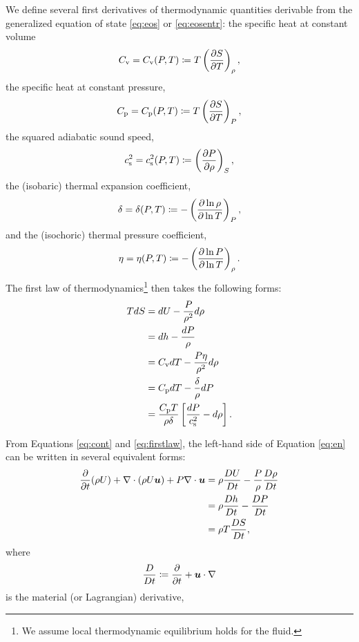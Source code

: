 \documentclass[12pt]{article}
\begin{document}
We define several first derivatives of thermodynamic quantities derivable from the generalized equation of state \eqref{eq:eos} or \eqref{eq:eosentr}: the specific heat at constant volume
\begin{align}\label{eq:cv}
	C_{\rm{v}}=C_{\rm{v}}(P,T)\coloneqq T\left(\frac{\partial S}{\partial T}\right)_\rho,
\end{align}
the specific heat at constant pressure, 
\begin{align}\label{eq:cp}
	C_{\rm{p}}=C_{\rm{p}}(P,T)\coloneqq T\left(\frac{\partial S}{\partial T}\right)_P,
\end{align}
the squared adiabatic sound speed,
\begin{align}\label{eq:cs2}
	c_{\rm s}^2=c_{\rm s}^2(P,T)\coloneqq \left(\frac{\partial P}{\partial\rho}\right)_S,
\end{align}
the (isobaric) thermal expansion coefficient,
\begin{align}\label{eq:delta}
	\delta=\delta(P,T)\coloneqq-\left(\frac{\partial\ln\rho}{\partial\ln T}\right)_P,
\end{align}
and the (isochoric) thermal pressure coefficient, 
\begin{align}\label{eq:eta}
	\eta=\eta(P,T)\coloneqq-\left(\frac{\partial\ln P}{\partial\ln T}\right)_\rho.
\end{align}
The first law of thermodynamics\footnote{We assume local thermodynamic equilibrium holds for the fluid.} then takes the following forms:
\begin{subequations}\label{eq:firstlaw}
	\begin{align}
		TdS &= dU - \frac{P}{\rho^2}d\rho \\
		&= dh - \frac{dP}{\rho}\\
		&= C_{\rm{v}} dT - \frac{P\eta}{\rho^2}d\rho\\		
		&= C_{\rm{p}} dT - \frac{\delta}{\rho}dP\\
		&=\frac{C_{\rm{p}} T}{\rho\delta}\left[\frac{dP}{c_{\rm s}^2}-d\rho\right].
	\end{align}
\end{subequations}

	From Equations \eqref{eq:cont} and \eqref{eq:firstlaw}, the left-hand side of Equation \eqref{eq:en} can be written in several equivalent forms:
	\begin{subequations}\label{eq:enlhs}
		\begin{align}
			\frac{\partial}{\partial t}(\rho U) + \nabla\cdot(\rho U\bm{u}) + P\nabla\cdot\bm{u} &= \rho\frac{DU}{Dt} - \frac{P}{\rho}\frac{D\rho}{Dt}\\
			&= \rho\frac{Dh}{Dt} -\frac{DP}{Dt}\\
			&=\rho T \frac{DS}{Dt},
		\end{align}
	\end{subequations}
	where 
	\begin{align}\label{eq:matderiv}
		\frac{D}{Dt}{}\coloneqq \frac{\partial}{\partial t} + \bm{u}\cdot\nabla
	\end{align}
	is the material (or Lagrangian) derivative,
	
\end{document}
